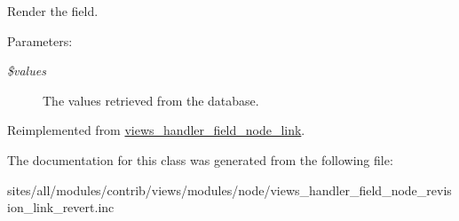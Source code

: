 Render the field.

\begin{Desc}
\item[Parameters:]
\begin{description}
\item[{\em \$values}]The values retrieved from the database. \end{description}
\end{Desc}


Reimplemented from \hyperlink{classviews__handler__field__node__link_9621ff38a6b318eb94f0c44fa2f711f5}{views\_\-handler\_\-field\_\-node\_\-link}.

The documentation for this class was generated from the following file:\begin{CompactItemize}
\item 
sites/all/modules/contrib/views/modules/node/views\_\-handler\_\-field\_\-node\_\-revision\_\-link\_\-revert.inc\end{CompactItemize}
